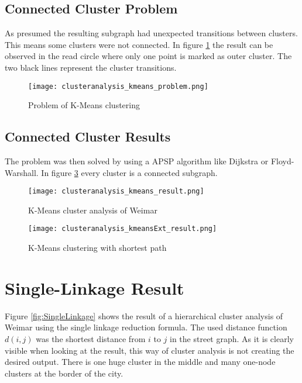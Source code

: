 \subsection{Connected Cluster Problem}
As presumed the resulting subgraph had unexpected transitions between clusters. This means some clusters were not connected. In figure \ref{fig:KmeansProblem} the result can be observed in the read circle where only one point is marked as outer cluster. The two black lines represent the cluster transitions.

\begin{figure}[!ht]
    \centering
    \begin{mdframed}[style=mdthight, userdefinedwidth=0.55\textwidth, align=center]
        \texttt{[image: clusteranalysis\_kmeans\_problem.png]}
    \end{mdframed}
    \caption{Problem of K-Means clustering
        \label{fig:KmeansProblem}}
\end{figure}

\subsection{Connected Cluster Results} \label{sec:K-Means_shortest_path}
The problem was then solved by using a \gls{APSP} algorithm like Dijkstra or Floyd-Warshall. In figure \ref{fig:Kmeansshortestp} every cluster is a connected subgraph.

\begin{figure}
    \centering
    \begin{mdframed}[style=mdthight]
        \texttt{[image: clusteranalysis\_kmeans\_result.png]}
    \end{mdframed}
    \caption{K-Means cluster analysis of Weimar \label{fig:KmeansGenerated}}
\end{figure}

\begin{figure}
    \centering
    \begin{mdframed}[style=mdthight]
        \texttt{[image: clusteranalysis\_kmeansExt\_result.png]}
    \end{mdframed}
    \caption{K-Means clustering with shortest path\label{fig:Kmeansshortestp}}
\end{figure}

\pagebreak
\section{Single-Linkage Result}
Figure \ref{fig:SingleLinkage} shows the result of a hierarchical cluster analysis of Weimar using the single linkage reduction formula. The used distance function $d(i, j)$ was the shortest distance from $i$ to $j$ in the street graph. As it is clearly visible when looking at the result, this way of cluster analysis is not creating the desired output. There is one huge cluster in the middle and many one-node clusters at the border of the city.

